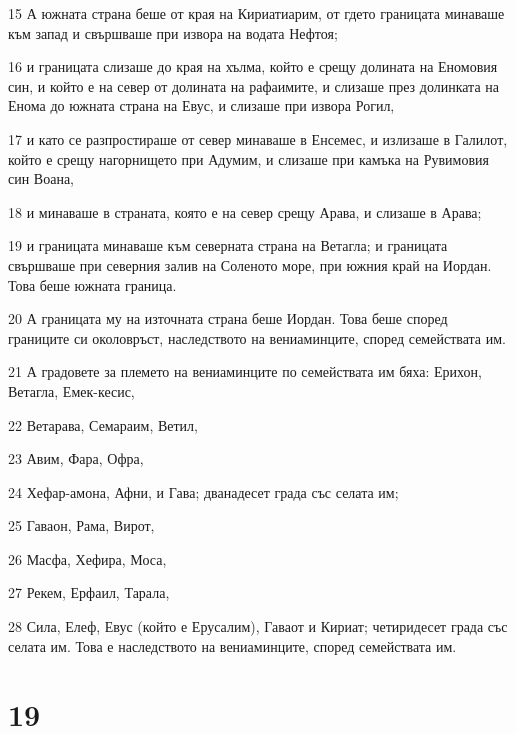 \par 15 А южната страна беше от края на Кириатиарим, от гдето границата минаваше към запад и свършваше при извора на водата Нефтоя;
\par 16 и границата слизаше до края на хълма, който е срещу долината на Еномовия син, и който е на север от долината на рафаимите, и слизаше през долинката на Енома до южната страна на Евус, и слизаше при извора Рогил,
\par 17 и като се разпростираше от север минаваше в Енсемес, и излизаше в Галилот, който е срещу нагорнището при Адумим, и слизаше при камъка на Рувимовия син Воана,
\par 18 и минаваше в страната, която е на север срещу Арава, и слизаше в Арава;
\par 19 и границата минаваше към северната страна на Ветагла; и границата свършваше при северния залив на Соленото море, при южния край на Иордан. Това беше южната граница.
\par 20 А границата му на източната страна беше Иордан. Това беше според границите си околовръст, наследството на вениаминците, според семействата им.
\par 21 А градовете за племето на вениаминците по семействата им бяха: Ерихон, Ветагла, Емек-кесис,
\par 22 Ветарава, Семараим, Ветил,
\par 23 Авим, Фара, Офра,
\par 24 Хефар-амона, Афни, и Гава; дванадесет града със селата им;
\par 25 Гаваон, Рама, Вирот,
\par 26 Масфа, Хефира, Моса,
\par 27 Рекем, Ерфаил, Тарала,
\par 28 Сила, Елеф, Евус (който е Ерусалим), Гаваот и Кириат; четиридесет града със селата им. Това е наследството на вениаминците, според семействата им.

\chapter{19}

